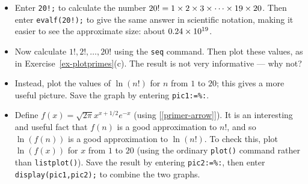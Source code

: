 \documentclass[a4paper,10pt]{amsbook}
\begin{document}
\begin{exercise}
 \begin{itemize}
  \item[(a)] Enter \verb~20!;~ to calculate the number
   $20!=1\times 2\times 3\times\dotsb\times 19\times 20$.  Then enter
   \verb~evalf(20!);~ to give the same answer in scientific notation,
   making it easier to see the approximate size: about
   $0.24\times 10^{19}$. 
  \item[(b)] Now calculate $1!,2!,\dotsc,20!$ using the
   \verb~seq~ command.  Then plot these values, as
   in Exercise~\ref{ex-plotprimes}(c). 
   The result is not very informative --- why not? 
  \item[(d)] Instead, plot the values of $\ln(n!)$ for $n$ from $1$ to
   $20$; this gives a more useful picture.  Save the graph by entering
   \verb~pic1:=%:~.  
  \item[(e)] Define $f(x)=\sqrt{2\pi} x^{x+1/2} e^{-x}$
   (using [\ref{primer-arrow}]).  It is an
   interesting and useful fact that $f(n)$ is a good approximation to
   $n!$, and so $\ln(f(n))$ is a good approximation to $\ln(n!)$.  To
   check this, plot $\ln(f(x))$ for $x$ from $1$ to $20$ (using the
   ordinary \verb~plot()~ command rather than \verb~listplot()~). 
   Save the result by entering \verb~pic2:=%:~,
   then enter \verb~display(pic1,pic2);~ to combine the two graphs. 
 \end{itemize}
\end{exercise}
\end{document}

